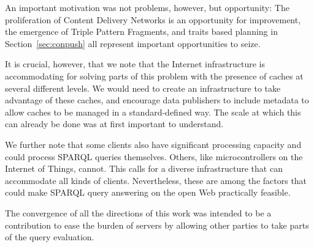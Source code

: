 An important motivation was not problems, however, but opportunity:
The proliferation of Content Delivery Networks is an opportunity for
improvement, the emergence of Triple Pattern Fragments, and traits
based planning in Section~\ref{sec:conpush} all represent important
opportunities to seize.


It is crucial, however, that we note that the Internet infrastructure
is accommodating for solving parts of this problem with the presence
of caches at several different levels. We would need to create an
infrastructure to take advantage of these caches, and encourage data
publishers to include metadata to allow caches to be managed in a
standard-defined way. The scale at which this can already be done was
at first important to understand.

We further note that some clients also have significant processing
capacity and could process SPARQL queries themselves. Others, like
microcontrollers on the Internet of Things, cannot. This calls for a
diverse infrastructure that can accommodate all kinds of
clients. Nevertheless, these are among the factors that
could make SPARQL query answering on the open Web practically
feasible. 

The convergence of all the directions of this work was intended to be
a contribution to ease the burden of servers by allowing other parties
to take parts of the query evaluation.



